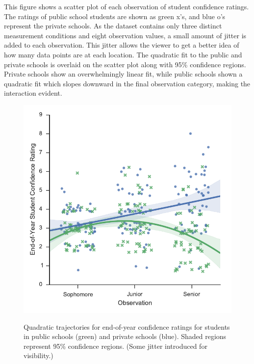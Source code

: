 \documentclass[onecolumn,10pt]{jhwhw}
\begin{document}

This figure shows a scatter plot of each observation of student confidence ratings. The ratings of public school students are shown as green x's, and blue o's represent the private schools. As the dataset contains only three distinct measurement conditions and eight observation values, a small amount of jitter is added to each observation. This jitter allows the viewer to get a better idea of how many data points are at each location. The quadratic fit to the public and private schools is overlaid on the scatter plot along with 95\% confidence regions. Private schools show an overwhelmingly linear fit, while public schools shown a quadratic fit which slopes downward in the final observation category, making the interaction evident.

\begin{figure}[h!]
\begin{center}
\includegraphics[width=1\textwidth]{prob5-quad.pdf}
\label{fig:on}
\end{center}
\caption{Quadratic trajectories for end-of-year confidence ratings for students in public schools (green) and private schools (blue). Shaded regions represent 95\% confidence regions. (Some jitter introduced for visibility.)}
\end{figure}
\end{document}
